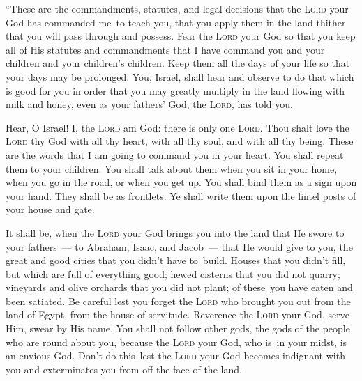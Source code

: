
\begin{inparaenum}
   ``These are the commandments, statutes, and legal decisions that the \textsc{Lord} your God has commanded me\understood\ to teach you, that you apply them in the land thither that you will pass through and possess.%
   Fear the \textsc{Lord} your God so that you keep all of His statutes and commandments that I have command you and your children and your children's children. Keep them all the days of your life so that your days may be prolonged.%
   You, Israel, shall hear and observe to do that which is good for you in order that you may greatly multiply in the land flowing with milk and honey, even as your fathers' God, the \textsc{Lord}, has told you.%
  
   Hear, O Israel! I, the \textsc{Lord} am God: there is only one \textsc{Lord}.%
   Thou shalt love the \textsc{Lord} thy God with all thy heart, with all thy soul, and with all thy being.%
   These are the words that I am going to command you in your heart.%
   You shall repeat them to your children. You shall talk about them when you sit in your home, when you go in the road, or when you get up.%
   You shall bind them as a sign upon your hand. They shall be as frontlets.%
   Ye shall write them upon the lintel posts of your house and gate.%
  
   It shall be, when the \textsc{Lord} your God brings you into the land that He swore to your fathers~--- to Abraham, Isaac, and Jacob~--- that He would give to you, the great and good cities that you didn't have to\understood\ build.%
   Houses that you didn't fill, but which are full of everything good; hewed cisterns that you did not quarry; vineyards and olive orchards that you did not plant; of these\understood\ you have eaten and been satiated.%
   Be careful lest you forget the \textsc{Lord} who brought you out from the land of Egypt, from the house of servitude.%
   Reverence the \textsc{Lord} your God, serve Him, swear by His name.%
   You shall not follow other gods, the gods of the people who are round about you,%
   because the \textsc{Lord} your God, who is\understood\ in your midst, is an envious God. Don't do this\understood\ lest the \textsc{Lord} your God becomes indignant with you and exterminates you from off the face of the land.%
  

\end{inparaenum}
